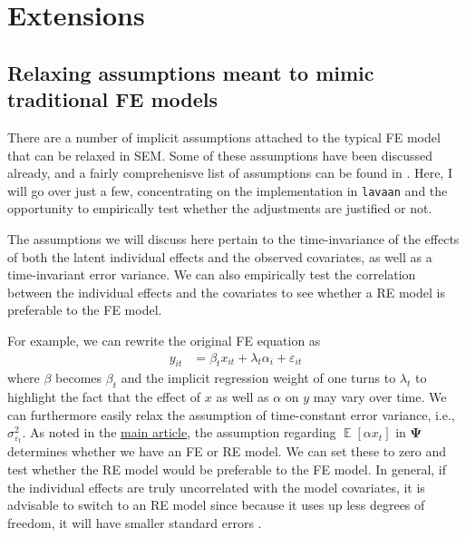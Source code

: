 \documentclass[]{interact}
\theoremstyle{plain}%
\theoremstyle{definition}
\theoremstyle{remark}
\begin{document}
\hypertarget{exten}{%
\section{Extensions}\label{exten}}

\hypertarget{relax}{%
\subsection{Relaxing assumptions meant to mimic traditional FE
models}\label{relax}}

There are a number of implicit assumptions attached to the typical FE
model that can be relaxed in SEM. Some of these assumptions have been
discussed already, and a fairly comprehenisve list of assumptions can be
found in \citet{Bollen2010}. Here, I will go over just a few,
concentrating on the implementation in \texttt{lavaan} and the
opportunity to empirically test whether the adjustments are justified or
not.

The assumptions we will discuss here pertain to the time-invariance of
the effects of both the latent individual effects and the observed
covariates, as well as a time-invariant error variance. We can also
empirically test the correlation between the individual effects and the
covariates to see whether a RE model is preferable to the FE model.

For example, we can rewrite the original FE equation as \begin{align}
y_{it} & = \beta_{t}x_{it} + \lambda_{t}\alpha_{i} + \varepsilon_{it}
\end{align} where \(\beta\) becomes \(\beta_{t}\) and the implicit
regression weight of one turns to \(\lambda_{t}\) to highlight the fact
that the effect of \(x\) as well as \(\alpha\) on \(y\) may vary over
time. We can furthermore easily relax the assumption of time-constant
error variance, i.e., \(\sigma^{2}_{\varepsilon_{t}}\). As noted in the
\href{https://github.com/henrik-andersen/FE-SEM/blob/master/article.pdf}{main
article}, the assumption regarding
\(\mathop{\mathrm{\mathbb{E}}}[\alpha x_{t}]\) in \(\bm{\Psi}\)
determines whether we have an FE or RE model. We can set these to zero
and test whether the RE model would be preferable to the FE model. In
general, if the individual effects are truly uncorrelated with the model
covariates, it is advisable to switch to an RE model since because it
uses up less degrees of freedom, it will have smaller standard errors
\citep{Bollen2010}.
\end{document}
